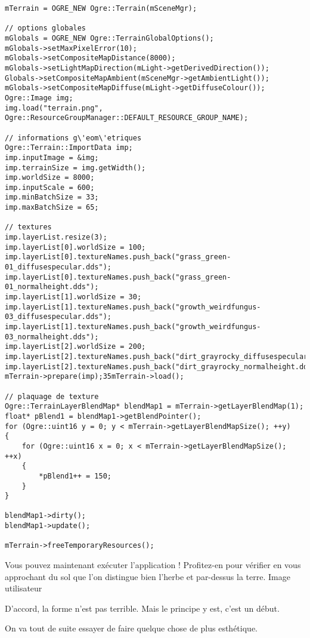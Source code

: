 \begin{lstlisting}[caption={createTerrain (code complet)}]
mTerrain = OGRE_NEW Ogre::Terrain(mSceneMgr);

// options globales
mGlobals = OGRE_NEW Ogre::TerrainGlobalOptions();
mGlobals->setMaxPixelError(10);
mGlobals->setCompositeMapDistance(8000);
mGlobals->setLightMapDirection(mLight->getDerivedDirection());
Globals->setCompositeMapAmbient(mSceneMgr->getAmbientLight());
mGlobals->setCompositeMapDiffuse(mLight->getDiffuseColour());
Ogre::Image img;
img.load("terrain.png", Ogre::ResourceGroupManager::DEFAULT_RESOURCE_GROUP_NAME);

// informations g\'eom\'etriques
Ogre::Terrain::ImportData imp;
imp.inputImage = &img;
imp.terrainSize = img.getWidth();
imp.worldSize = 8000;
imp.inputScale = 600;
imp.minBatchSize = 33;
imp.maxBatchSize = 65;

// textures
imp.layerList.resize(3);
imp.layerList[0].worldSize = 100;
imp.layerList[0].textureNames.push_back("grass_green-01_diffusespecular.dds");
imp.layerList[0].textureNames.push_back("grass_green-01_normalheight.dds");
imp.layerList[1].worldSize = 30;
imp.layerList[1].textureNames.push_back("growth_weirdfungus-03_diffusespecular.dds");
imp.layerList[1].textureNames.push_back("growth_weirdfungus-03_normalheight.dds");
imp.layerList[2].worldSize = 200;
imp.layerList[2].textureNames.push_back("dirt_grayrocky_diffusespecular.dds");
imp.layerList[2].textureNames.push_back("dirt_grayrocky_normalheight.dds");
mTerrain->prepare(imp);35mTerrain->load();

// plaquage de texture
Ogre::TerrainLayerBlendMap* blendMap1 = mTerrain->getLayerBlendMap(1);
float* pBlend1 = blendMap1->getBlendPointer();
for (Ogre::uint16 y = 0; y < mTerrain->getLayerBlendMapSize(); ++y)
{
    for (Ogre::uint16 x = 0; x < mTerrain->getLayerBlendMapSize(); ++x)
    {
        *pBlend1++ = 150;
    }
}

blendMap1->dirty();
blendMap1->update();

mTerrain->freeTemporaryResources();
\end{lstlisting}

Vous pouvez maintenant ex\'ecuter l'application ! Profitez-en pour v\'erifier en vous approchant du sol que l'on distingue bien l'herbe et par-dessus la terre.
Image utilisateur


D'accord, la forme n'est pas terrible. Mais le principe y est, c'est un d\'ebut.

On va tout de suite essayer de faire quelque chose de plus esth\'etique.

